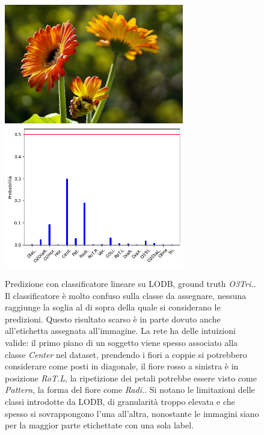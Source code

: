 \begin{figure}[p]
    \centering
    \includegraphics[height=52mm, valign=t]{Immagini/risultati/derodeolifant32584725236.jpg}
    \includegraphics[height=62mm, valign=t]{Immagini/risultati/lodb_1012_prob.png}
    \caption{Predizione con classificatore lineare su LODB, ground truth \textit{O3Tri.}. Il classificatore è molto confuso sulla classe da assegnare, nessuna raggiunge la soglia al di sopra della quale si considerano le predizioni. Questo risultato scarso è in parte dovuto anche all'etichetta assegnata all'immagine. La rete ha delle intuizioni valide: il primo piano di un soggetto viene spesso associato alla classe \textit{Center} nel dataset, prendendo i fiori a coppie si potrebbero considerare come posti in diagonale, il fiore rosso a sinistra è in posizione \textit{RoT.L}, la ripetizione dei petali potrebbe essere visto come \textit{Pattern}, la forma del fiore come \textit{Radi.}. Si notano le limitazioni delle classi introdotte da LODB, di granularità troppo elevata e che spesso si sovrappongono l'una all'altra, nonostante le immagini siano per la maggior parte etichettate con una sola label.}
    \label{fig:lodb_prob}
\end{figure}

